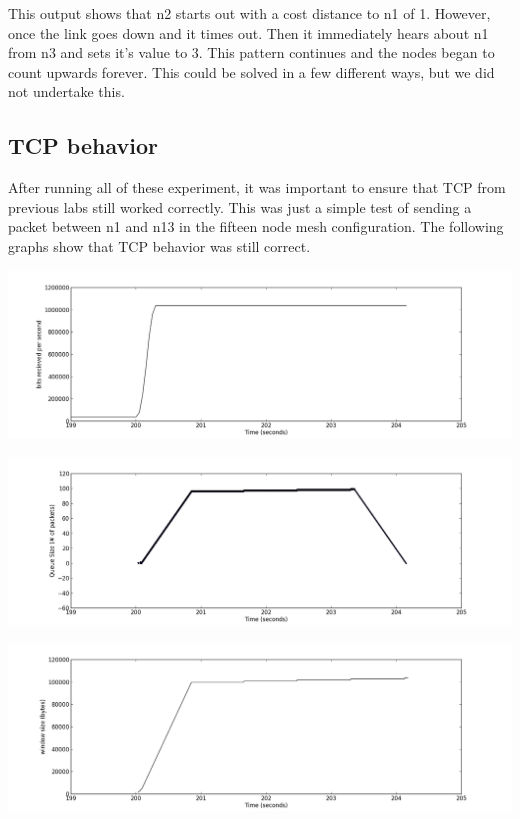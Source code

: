 \documentclass[11pt]{article}
\begin{document}
This output shows that n2 starts out with a cost distance to n1 of 1. However, once the link goes down and it times out. Then it immediately hears about n1 from n3 and sets it's value to 3. This pattern continues and the nodes began to count upwards forever. This could be solved in a few different ways, but we did not undertake this.


\subsection{TCP behavior}

After running all of these experiment, it was important to ensure that TCP from previous labs still worked correctly. This was just a simple test of sending a packet between n1 and n13 in the fifteen node mesh configuration. The following graphs show that TCP behavior was still correct.

\centerline{\includegraphics[width=16cm]{plot_rate_one.png}}

\centerline{\includegraphics[width=16cm]{queue_time_one.png}}

\centerline{\includegraphics[width=16cm]{window_time_one.png}}
\end{document}
